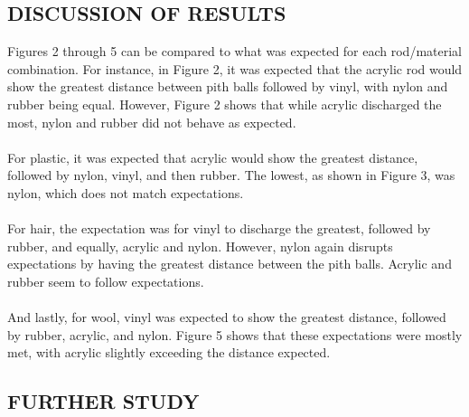 \documentclass [12pt, letterpaper, twoside] {article}
\begin{document}
\begin {figure}
  \centering
  \caption {}
\end {figure}

\subsection* {DISCUSSION OF RESULTS}
Figures 2 through 5 can be compared to what was expected for each rod/material combination. For instance, in Figure 2, it was expected that the acrylic rod would show the greatest distance between pith balls followed by vinyl, with nylon and rubber being equal. However, Figure 2 shows that while acrylic discharged the most, nylon and rubber did not behave as expected. \\\\
For plastic, it was expected that acrylic would show the greatest distance, followed by nylon, vinyl, and then rubber. The lowest, as shown in Figure 3, was nylon, which does not match expectations. \\\\
For hair, the expectation was for vinyl to discharge the greatest, followed by rubber, and equally, acrylic and nylon. However, nylon again disrupts expectations by having the greatest distance between the pith balls. Acrylic and rubber seem to follow expectations. \\\\
And lastly, for wool, vinyl was expected to show the greatest distance, followed by rubber, acrylic, and nylon. Figure 5 shows that these expectations were mostly met, with acrylic slightly exceeding the distance expected. \\

\subsection* {FURTHER STUDY}
\end{document}

